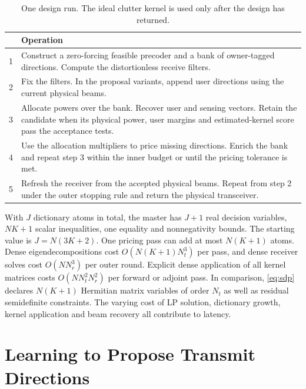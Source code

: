 \documentclass[journal]{IEEEtran}
\begin{document}
\begin{table}[t]\centering\footnotesize
\caption{One design run. The ideal clutter kernel is used only after the design has returned.}
\begin{tabular}{@{}r p{}@{}}\toprule
 & Operation\\\midrule
1 & Construct a zero-forcing feasible precoder and a bank of owner-tagged directions. Compute the distortionless receive filters.\\
2 & Fix the filters. In the proposal variants, append user directions using the current physical beams.\\
3 & Allocate powers over the bank. Recover user and sensing vectors. Retain the candidate when its physical power, user margins and estimated-kernel score pass the acceptance tests.\\
4 & Use the allocation multipliers to price missing directions. Enrich the bank and repeat step 3 within the inner budget or until the pricing tolerance is met.\\
5 & Refresh the receiver from the accepted physical beams. Repeat from step 2 under the outer stopping rule and return the physical transceiver.\\\bottomrule
\end{tabular}\end{table}
With $J$ dictionary atoms in total, the master has $J+1$ real decision variables, $NK+1$ scalar inequalities, one equality and nonnegativity bounds. The starting value is $J=N(3K+2)$. One pricing pass can add at most $N(K+1)$ atoms. Dense eigendecompositions cost $O(N(K+1)N_t^3)$ per pass, and dense receiver solves cost $O(NN_r^3)$ per outer round. Explicit dense application of all kernel matrices costs $O(NN_t^2N_r^2)$ per forward or adjoint pass. In comparison, \eqref{eq:sdp} declares $N(K+1)$ Hermitian matrix variables of order $N_t$ as well as residual semidefinite constraints. The varying cost of LP solution, dictionary growth, kernel application and beam recovery all contribute to latency.

\section{Learning to Propose Transmit Directions}
\end{document}
